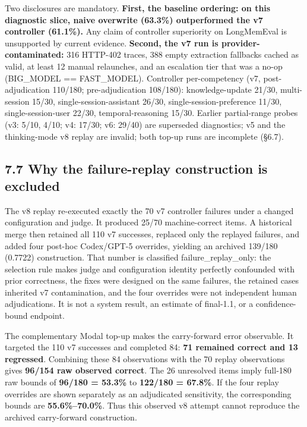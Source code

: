Two disclosures are mandatory. \textbf{First, the baseline ordering: on
this diagnostic slice, naive overwrite (63.3\%) outperformed the v7
controller (61.1\%).} Any claim of controller superiority on LongMemEval
is unsupported by current evidence. \textbf{Second, the v7 run is
provider-contaminated:} 316 HTTP-402 traces, 388 empty extraction
fallbacks cached as valid, at least 12 manual relaunches, and an
escalation tier that was a no-op (BIG\_MODEL == FAST\_MODEL). Controller
per-competency (v7, post-adjudication 110/180; pre-adjudication
108/180): knowledge-update 21/30, multi-session 15/30,
single-session-assistant 26/30, single-session-preference 11/30,
single-session-user 22/30, temporal-reasoning 15/30. Earlier
partial-range probes (v3: 5/10, 4/10; v4: 17/30; v6: 29/40) are
superseded diagnostics; v5 and the thinking-mode v8 replay are invalid;
both top-up runs are incomplete (§6.7).

\subsection{7.7 Why the failure-replay construction is
excluded}\label{why-the-failure-replay-construction-is-excluded}

The v8 replay re-executed exactly the 70 v7 controller failures under a
changed configuration and judge. It produced 25/70 machine-correct
items. A historical merge then retained all 110 v7 successes, replaced
only the replayed failures, and added four post-hoc Codex/GPT-5
overrides, yielding an archived 139/180 (0.7722) construction. That
number is classified failure\_replay\_only: the selection rule makes
judge and configuration identity perfectly confounded with prior
correctness, the fixes were designed on the same failures, the retained
cases inherited v7 contamination, and the four overrides were not
independent human adjudications. It is not a system result, an estimate
of final-1.1, or a confidence-bound endpoint.

The complementary Modal top-up makes the carry-forward error observable.
It targeted the 110 v7 successes and completed 84: \textbf{71 remained
correct and 13 regressed}. Combining these 84 observations with the 70
replay observations gives \textbf{96/154 raw observed correct}. The 26
unresolved items imply full-180 raw bounds of \textbf{96/180 = 53.3\%}
to \textbf{122/180 = 67.8\%}. If the four replay overrides are shown
separately as an adjudicated sensitivity, the corresponding bounds are
\textbf{55.6\%--70.0\%}. Thus this observed v8 attempt cannot reproduce
the archived carry-forward construction.

